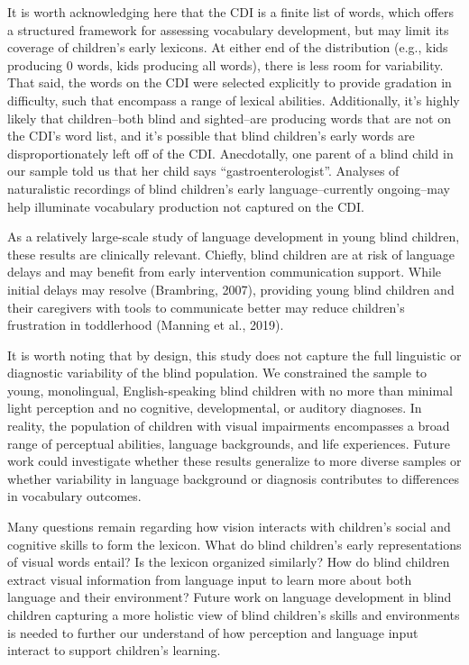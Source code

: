 \documentclass[
  man,floatsintext]{apa6}
\begin{document}
It is worth acknowledging here that the CDI is a finite list of words, which offers a structured framework for assessing vocabulary development, but may limit its coverage of children's early lexicons. At either end of the distribution (e.g., kids producing 0 words, kids producing all words), there is less room for variability. That said, the words on the CDI were selected explicitly to provide gradation in difficulty, such that encompass a range of lexical abilities. Additionally, it's highly likely that children--both blind and sighted--are producing words that are not on the CDI's word list, and it's possible that blind children's early words are disproportionately left off of the CDI. Anecdotally, one parent of a blind child in our sample told us that her child says ``gastroenterologist''. Analyses of naturalistic recordings of blind children's early language--currently ongoing--may help illuminate vocabulary production not captured on the CDI.

As a relatively large-scale study of language development in young blind children, these results are clinically relevant. Chiefly, blind children are at risk of language delays and may benefit from early intervention communication support. While initial delays may resolve (Brambring, 2007), providing young blind children and their caregivers with tools to communicate better may reduce children's frustration in toddlerhood (Manning et al., 2019).

It is worth noting that by design, this study does not capture the full linguistic or diagnostic variability of the blind population. We constrained the sample to young, monolingual, English-speaking blind children with no more than minimal light perception and no cognitive, developmental, or auditory diagnoses. In reality, the population of children with visual impairments encompasses a broad range of perceptual abilities, language backgrounds, and life experiences. Future work could investigate whether these results generalize to more diverse samples or whether variability in language background or diagnosis contributes to differences in vocabulary outcomes.

Many questions remain regarding how vision interacts with children's social and cognitive skills to form the lexicon. What do blind children's early representations of visual words entail? Is the lexicon organized similarly? How do blind children extract visual information from language input to learn more about both language and their environment? Future work on language development in blind children capturing a more holistic view of blind children's skills and environments is needed to further our understand of how perception and language input interact to support children's learning.
\end{document}
